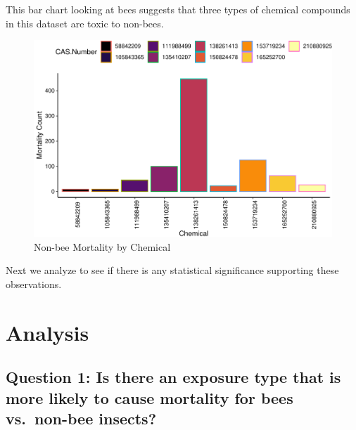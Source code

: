 \documentclass[
  12pt,
]{article}
\begin{document}
This bar chart looking at bees suggests that three types of chemical
compounds in this dataset are toxic to non-bees.

\begin{figure}
\centering
\includegraphics{UpdatedwithModel_files/figure-latex/unnamed-chunk-6-1.pdf}
\caption{Non-bee Mortality by Chemical}
\end{figure}

Next we analyze to see if there is any statistical significance
supporting these observations. \newpage

\hypertarget{analysis}{%
\section{Analysis}\label{analysis}}

\hypertarget{question-1-is-there-an-exposure-type-that-is-more-likely-to-cause-mortality-for-bees-vs.-non-bee-insects}{%
\subsection{Question 1: Is there an exposure type that is more likely to
cause mortality for bees vs.~non-bee
insects?}\label{question-1-is-there-an-exposure-type-that-is-more-likely-to-cause-mortality-for-bees-vs.-non-bee-insects}}
\end{document}
